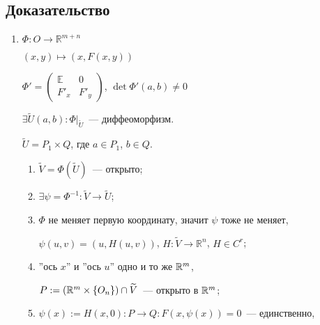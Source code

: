 \documentclass{article}
\begin{document}
        \subsection{Доказательство}
        
            \begin{enumerate}
            
                \item $\Phi : O \rightarrow \mathbb{R}^{m + n}$
                
                    $(x, y) \mapsto \left( x, F(x, y) \right)$
                    
                    $\Phi' = \begin{pmatrix} \mathbb{E} & \mathrm{0} \\ F'_x & F'_y \end{pmatrix}$, $\det \Phi'(a, b) \neq 0$
                    
                    $\exists \widetilde{U}(a, b) : \Phi \big|_{\widetilde{U}}$~--- диффеоморфизм.
                    
                    $\widetilde{U} = P_1 \times Q$, где $a \in P_1$, $b \in Q$.
                    
                    \begin{enumerate}
                    
                        \item $\widetilde{V} = \Phi \left( \widetilde{U} \right)$~--- открыто;
                        
                        \item $\exists \psi = \Phi^{-1} : \widetilde{V} \rightarrow \widetilde{U}$;
                        
                        \item $\Phi$ не меняет первую координату, значит $\psi$ тоже не меняет,
                        
                            $\psi(u, v) = (u, H(u, v) )$, $H : \widetilde{V} \rightarrow \mathbb{R}^n$, $H \in C^r$;
                            
                        \item ''ось $x$'' и ''ось $u$'' одно и то же $\mathbb{R}^m$,
                        
                            $P := \left( \mathbb{R}^m \times \left\{ O_n \right\} \right) \cap \widetilde{V}$~--- открыто в $\mathbb{R}^m$;
                            
                        \item $\psi (x) := H(x, 0) : P \rightarrow Q : F(x, \psi(x) ) = 0$~--- единственно,
                        

\end{enumerate}
\end{enumerate}
\end{document}
